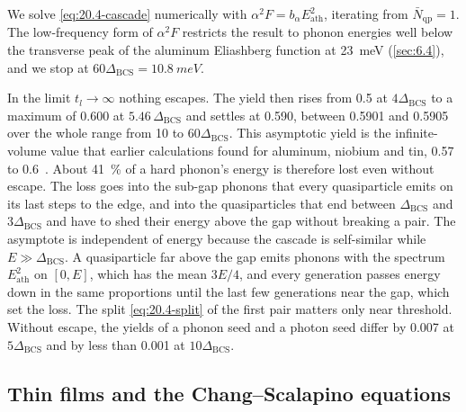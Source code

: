 We solve \cref{eq:20.4-cascade} numerically with $\alpha^2F = b_\alpha E_{\mathrm{ath}}^2$, iterating from $\bar N_{\mathrm{qp}} = 1$. The low-frequency form of $\alpha^2F$ restricts the result to phonon energies well below the transverse peak of the aluminum Eliashberg function at \SI{23}{meV} (\cref{sec:6.4}), and we stop at $60\Delta_{\mathrm{BCS}} = \SI{10.8}{meV}$.

In the limit $t_l \to \infty$ nothing escapes. The yield then rises from 0.5 at $4\Delta_{\mathrm{BCS}}$ to a maximum of 0.600 at $5.46\,\Delta_{\mathrm{BCS}}$ and settles at 0.590, between 0.5901 and 0.5905 over the whole range from 10 to $60\Delta_{\mathrm{BCS}}$. This asymptotic yield is the infinite-volume value that earlier calculations found for aluminum, niobium and tin, 0.57 to 0.6~\cite[p.~2]{guruswamy2014quasiparticle}. About \SI{41}{\percent} of a hard phonon's energy is therefore lost even without escape. The loss goes into the sub-gap phonons that every quasiparticle emits on its last steps to the edge, and into the quasiparticles that end between $\Delta_{\mathrm{BCS}}$ and $3\Delta_{\mathrm{BCS}}$ and have to shed their energy above the gap without breaking a pair. The asymptote is independent of energy because the cascade is self-similar while $E \gg \Delta_{\mathrm{BCS}}$. A quasiparticle far above the gap emits phonons with the spectrum $E_{\mathrm{ath}}^2$ on $[0, E]$, which has the mean $3E/4$, and every generation passes energy down in the same proportions until the last few generations near the gap, which set the loss. The split \cref{eq:20.4-split} of the first pair matters only near threshold. Without escape, the yields of a phonon seed and a photon seed differ by 0.007 at $5\Delta_{\mathrm{BCS}}$ and by less than 0.001 at $10\Delta_{\mathrm{BCS}}$.

\subsection{Thin films and the Chang--Scalapino equations}\label{sec:20.4-film}

